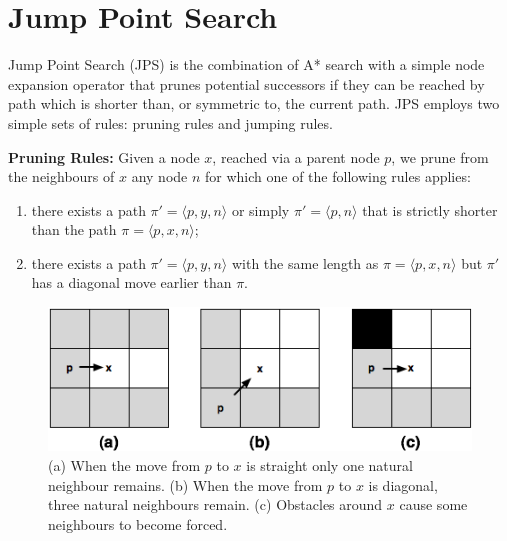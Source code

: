 \section{Jump Point Search}
\label{sec::jps}
Jump Point Search (JPS) is the combination of A* search with a simple
node expansion operator that prunes potential successors if
they can be reached by path which is shorter than, or symmetric to,
the current path. JPS employs two simple sets of rules:
pruning rules and jumping rules. 

\textbf{Pruning Rules:}
Given a node $x$, reached via a parent node $p$,
we prune from the neighbours of $x$ any node $n$ for which one 
of the following rules applies:
\begin{enumerate}
\item 
  there exists a path $\pi' = \langle p,y,n \rangle$ or simply $\pi' = \langle p, n \rangle$
  that is strictly shorter than the path $\pi = \langle p,x,n \rangle$; 
\item 
  there exists a path $\pi' = \langle p,y,n \rangle$ 
  with the same length as $\pi = \langle p,x,n \rangle$ but $\pi'$ has a 
  diagonal move earlier than $\pi$.  
\end{enumerate}

\begin{figure}[tb]
       \begin{center}
		   \includegraphics[width=0.95\columnwidth]
			{diagrams/pruning.png}
       \end{center}
	\vspace{-3pt}
       \caption{(a) When the move from $p$ to $x$ is straight only one natural neighbour remains.
(b) When the move from $p$ to $x$ is diagonal, three natural neighbours remain. (c) Obstacles around $x$
cause some neighbours to become forced. }
       \label{fig:pruning}
\end{figure}

